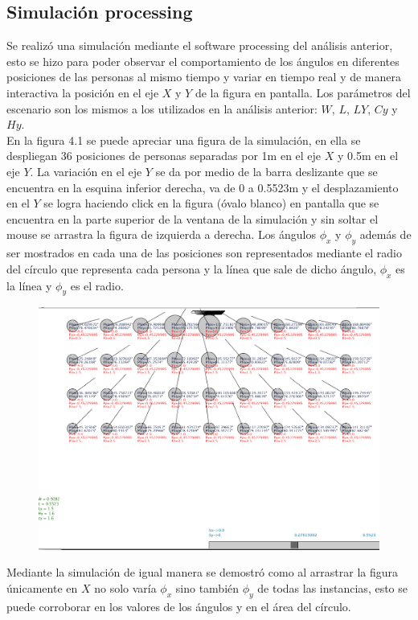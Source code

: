 \subsection{Simulación processing}
Se realizó una simulación mediante el software processing del análisis anterior, esto se hizo para poder observar el comportamiento de los ángulos en diferentes posiciones de las personas al mismo tiempo y variar en tiempo real y de manera interactiva la posición en el eje $X$ y $Y$ de la figura en pantalla. Los parámetros del escenario son los mismos a los utilizados en la análisis anterior: $W$, $L$, $LY$, $Cy$ y $Hy$. \\
En la figura 4.1 se puede apreciar una figura de la simulación, en ella se despliegan 36 posiciones de personas separadas por 1m en el eje $X$ y 0.5m en el eje $Y$. La variación en el eje $Y$ se da por medio de la barra deslizante que se encuentra en la esquina inferior derecha, va de 0 a 0.5523m y el desplazamiento en el $Y$ se logra haciendo click en la figura (óvalo blanco) en pantalla que se encuentra en la parte superior de la ventana de la simulación y sin soltar el mouse se arrastra la figura de izquierda a derecha. Los ángulos $\phi_x$ y $\phi_y$ además de ser mostrados en cada una de las posiciones son representados mediante el radio del círculo que representa cada persona y la línea que sale de dicho ángulo, $\phi_x$ es la línea y $\phi_y$ es el radio.\\
\begin{figure}[htbp]
    	\centering
    	\includegraphics[width=1\textwidth]{./pictures/sim}
    	\caption{}\label{fig: figura}
\end{figure}
Mediante la simulación de igual manera se demostró como al arrastrar la figura únicamente en $X$ no solo varía $\phi_x$ sino también $\phi_y$ de todas las instancias, esto se puede corroborar en los valores de los ángulos y en el área del círculo.

